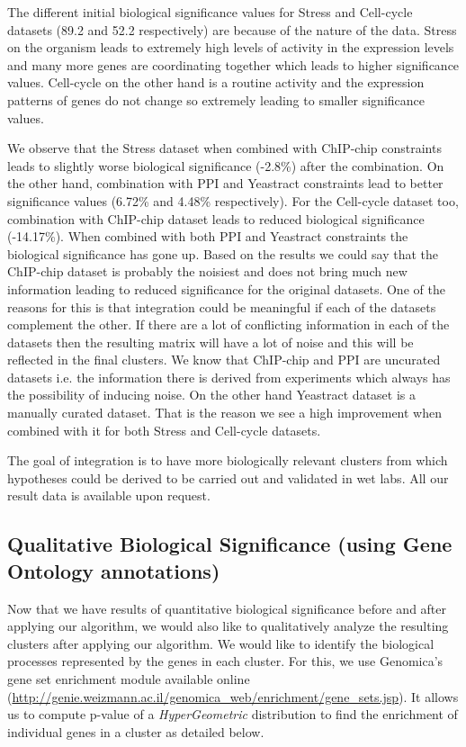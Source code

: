 The different initial biological significance values for Stress and Cell-cycle datasets (89.2 and 52.2 respectively) are because of the nature of the data. Stress on the organism 
leads to extremely high levels of activity 
in the expression levels and many more genes are coordinating together which leads to higher significance values. Cell-cycle on the other hand is a routine activity and the 
expression patterns of genes do not change so extremely leading to smaller significance values.

We observe that the Stress dataset when combined with ChIP-chip constraints leads to slightly worse biological significance (-2.8\%) after the combination. On the other hand, combination with PPI and Yeastract constraints lead to better significance values (6.72\% and 4.48\% respectively). For 
the Cell-cycle dataset too, combination with ChIP-chip dataset leads to reduced biological significance (-14.17\%). When combined with both PPI and Yeastract constraints the biological significance 
has gone up. Based on the results we could say that the ChIP-chip dataset is probably the noisiest and does not bring much new information leading to reduced significance for the original datasets. 
One of the reasons for this is that integration could be meaningful if each of the datasets complement the other. If there are 
a lot of conflicting information in each of the datasets then the resulting matrix will have a lot of noise and this will be reflected in the final clusters. We know that ChIP-chip and PPI are uncurated datasets i.e. the information there is derived from experiments which always has the possibility of inducing noise. On the other hand Yeastract 
dataset is a manually curated dataset. That is the reason we see a high improvement when combined with it for both Stress and Cell-cycle datasets. 
  
The goal of integration is to have more biologically relevant clusters from which hypotheses could be derived to be carried out and validated in wet labs. All our result data is available upon request. 

\subsection{Qualitative Biological Significance (using Gene Ontology annotations)} \label{semisup_biosig_go}
Now that we have results of quantitative biological significance before and after applying our algorithm, we would also like to qualitatively analyze the resulting clusters after 
applying our algorithm. We would like to identify the biological processes represented by the genes in each cluster. For this, we use Genomica's gene set enrichment module available online (\url{http://genie.weizmann.ac.il/genomica_web/enrichment/gene_sets.jsp}). It allows us to compute 
p-value of a \textit{HyperGeometric} distribution to find the enrichment of individual genes in a cluster as detailed below.

